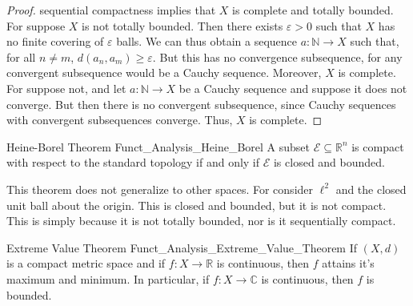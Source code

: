 \begin{proof}
                sequential compactness implies that $X$ is
                complete and totally bounded. For suppose $X$ is
                not totally bounded. Then there exists
                $\varepsilon>0$ such that $X$ has no finite
                covering of $\varepsilon$ balls. We can thus
                obtain a sequence $a:\mathbb{N}\rightarrow{X}$
                such that, for all $n\ne{m}$,
                $d(a_{n},a_{m})\geq\varepsilon$. But this
                has no convergence subsequence, for any convergent
                subsequence would be a Cauchy sequence. Moreover,
                $X$ is complete. For suppose not, and let
                $a:\mathbb{N}\rightarrow{X}$ be a Cauchy sequence
                and suppose it does not converge. But then there
                is no convergent subsequence, since Cauchy
                sequences with convergent subsequences converge.
                Thus, $X$ is complete.
            \end{proof}
            \begin{ltheorem}{Heine-Borel Theorem}
                  {Funct_Analysis_Heine_Borel}
                A subset $\mathcal{E}\subseteq\mathbb{R}^{n}$ is
                compact with respect to the standard topology if and
                only if $\mathcal{E}$ is closed and bounded.
            \end{ltheorem}
            This theorem does not generalize to other spaces. For
            consider $\ell^{2}$ and the closed unit ball about the
            origin. This is closed and bounded, but it is not
            compact. This is simply because it is not totally
            bounded, nor is it sequentially compact.
            \begin{ltheorem}{Extreme Value Theorem}
                  {Funct_Analysis_Extreme_Value_Theorem}
                If $(X,d)$ is a compact metric space and if
                $f:X\rightarrow\mathbb{R}$ is continuous, then
                $f$ attains it's maximum and minimum. In particular,
                if $f:X\rightarrow\mathbb{C}$ is continuous, then
                $f$ is bounded.
            \end{ltheorem}
